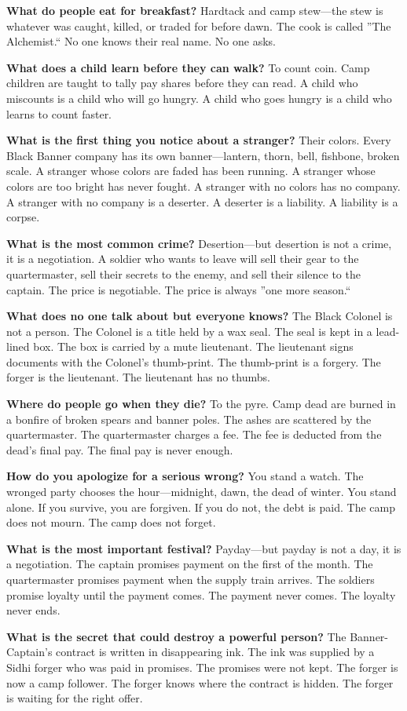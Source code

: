 \vspace{1em}

\begin{almanac}
\textbf{What do people eat for breakfast?} Hardtack and camp stew---the stew is whatever was caught, killed, or traded for before dawn. The cook is called ''The Alchemist.`` No one knows their real name. No one asks.

\textbf{What does a child learn before they can walk?} To count coin. Camp children are taught to tally pay shares before they can read. A child who miscounts is a child who will go hungry. A child who goes hungry is a child who learns to count faster.

\textbf{What is the first thing you notice about a stranger?} Their colors. Every Black Banner company has its own banner---lantern, thorn, bell, fishbone, broken scale. A stranger whose colors are faded has been running. A stranger whose colors are too bright has never fought. A stranger with no colors has no company. A stranger with no company is a deserter. A deserter is a liability. A liability is a corpse.

\textbf{What is the most common crime?} Desertion---but desertion is not a crime, it is a negotiation. A soldier who wants to leave will sell their gear to the quartermaster, sell their secrets to the enemy, and sell their silence to the captain. The price is negotiable. The price is always ''one more season.``

\textbf{What does no one talk about but everyone knows?} The Black Colonel is not a person. The Colonel is a title held by a wax seal. The seal is kept in a lead-lined box. The box is carried by a mute lieutenant. The lieutenant signs documents with the Colonel's thumb-print. The thumb-print is a forgery. The forger is the lieutenant. The lieutenant has no thumbs.

\textbf{Where do people go when they die?} To the pyre. Camp dead are burned in a bonfire of broken spears and banner poles. The ashes are scattered by the quartermaster. The quartermaster charges a fee. The fee is deducted from the dead's final pay. The final pay is never enough.

\textbf{How do you apologize for a serious wrong?} You stand a watch. The wronged party chooses the hour---midnight, dawn, the dead of winter. You stand alone. If you survive, you are forgiven. If you do not, the debt is paid. The camp does not mourn. The camp does not forget.

\textbf{What is the most important festival?} Payday---but payday is not a day, it is a negotiation. The captain promises payment on the first of the month. The quartermaster promises payment when the supply train arrives. The soldiers promise loyalty until the payment comes. The payment never comes. The loyalty never ends.

\textbf{What is the secret that could destroy a powerful person?} The Banner-Captain's contract is written in disappearing ink. The ink was supplied by a Sidhi forger who was paid in promises. The promises were not kept. The forger is now a camp follower. The forger knows where the contract is hidden. The forger is waiting for the right offer.
\end{almanac}

